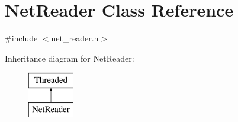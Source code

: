 \hypertarget{class_net_reader}{
\section{NetReader Class Reference}
\label{class_net_reader}
}


{\ttfamily \#include $<$net\_\-reader.h$>$}

Inheritance diagram for NetReader:\begin{figure}[H]
\begin{center}
\leavevmode
\includegraphics[height=2.000000cm]{class_net_reader}
\end{center}
\end{figure}
